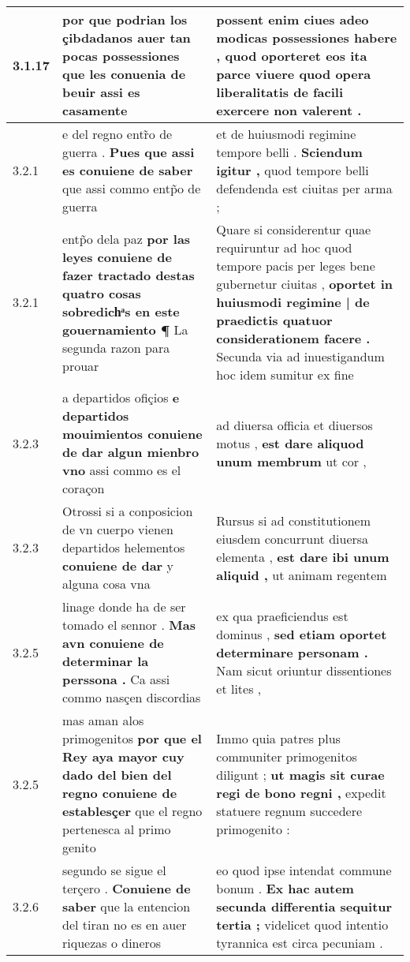 \begin{tabular}{|p{1cm}|p{6.5cm}|p{6.5cm}|}
3.1.17 & por que podrian los çibdadanos auer tan pocas possessiones \textbf{ que les conuenia de beuir } assi es casamente & possent enim ciues adeo modicas possessiones habere , \textbf{ quod oporteret eos ita parce viuere } quod opera liberalitatis de facili exercere non valerent . \\\hline
3.2.1 & e del regno entr̃o de guerra . \textbf{ Pues que assi es conuiene de saber } que assi commo entp̃o de guerra & et de huiusmodi regimine tempore belli . \textbf{ Sciendum igitur , } quod tempore belli defendenda est ciuitas per arma ; \\\hline
3.2.1 & entp̃o dela paz \textbf{ por las leyes conuiene de fazer tractado destas quatro cosas sobredichͣs en este gouernamiento ¶ } La segunda razon para prouar & Quare si considerentur quae requiruntur ad hoc quod tempore pacis per leges bene gubernetur ciuitas , \textbf{ oportet in huiusmodi regimine | de praedictis quatuor considerationem facere . } Secunda via ad inuestigandum hoc idem sumitur ex fine \\\hline
3.2.3 & a departidos ofiçios \textbf{ e departidos mouimientos conuiene de dar algun mienbro vno } assi commo es el coraçon & ad diuersa officia et diuersos motus , \textbf{ est dare aliquod unum membrum } ut cor , \\\hline
3.2.3 & Otrossi si a conposicion de vn cuerpo vienen departidos helementos \textbf{ conuiene de dar } y alguna cosa vna & Rursus si ad constitutionem eiusdem concurrunt diuersa elementa , \textbf{ est dare ibi unum aliquid , } ut animam regentem \\\hline
3.2.5 & linage donde ha de ser tomado el sennor . \textbf{ Mas avn conuiene de determinar la perssona . } Ca assi commo nasçen discordias & ex qua praeficiendus est dominus , \textbf{ sed etiam oportet determinare personam . } Nam sicut oriuntur dissentiones et lites , \\\hline
3.2.5 & mas aman alos primogenitos \textbf{ por que el Rey aya mayor cuy dado del bien del regno conuiene de establesçer } que el regno pertenesca al primo genito & Immo quia patres plus communiter primogenitos diligunt ; \textbf{ ut magis sit curae regi de bono regni , } expedit statuere regnum succedere primogenito : \\\hline
3.2.6 & segundo se sigue el terçero . \textbf{ Conuiene de saber } que la entencion del tiran no es en auer riquezas o dineros & eo quod ipse intendat commune bonum . \textbf{ Ex hac autem secunda differentia sequitur tertia ; } videlicet quod intentio tyrannica est circa pecuniam . \\\hline

\end{tabular}
